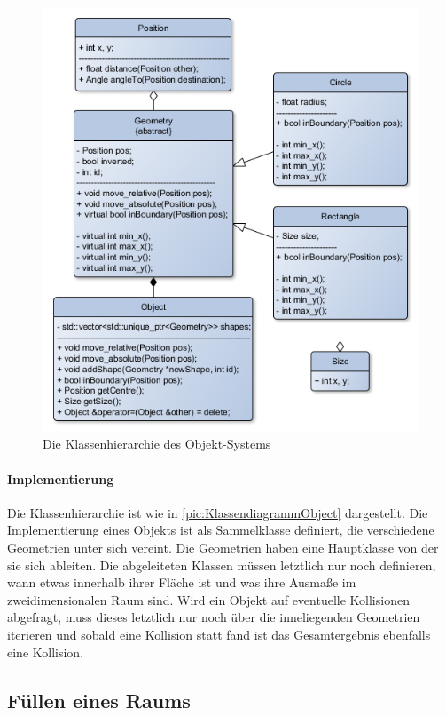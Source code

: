 \begin{figure}
	\includegraphics[width=\pictureWidth,keepaspectratio]{graphics/Klassendiagramme/KlassendiagrammObject.png}
	\caption{Die Klassenhierarchie des Objekt-Systems}
	\label{pic:KlassendiagrammObject}
\end{figure}

\paragraph*{Implementierung}
Die Klassenhierarchie ist wie in \autoref{pic:KlassendiagrammObject} dargestellt. Die Implementierung eines Objekts ist als Sammelklasse definiert, die verschiedene Geometrien unter sich vereint. Die Geometrien haben eine Hauptklasse von der sie sich ableiten. Die abgeleiteten Klassen müssen letztlich nur noch definieren, wann etwas innerhalb ihrer Fläche ist und was ihre Ausmaße im zweidimensionalen Raum sind. Wird ein Objekt auf eventuelle Kollisionen abgefragt, muss dieses letztlich nur noch über die inneliegenden Geometrien iterieren und sobald eine Kollision statt fand ist das Gesamtergebnis ebenfalls eine Kollision.

\subsection*{Füllen eines Raums}

